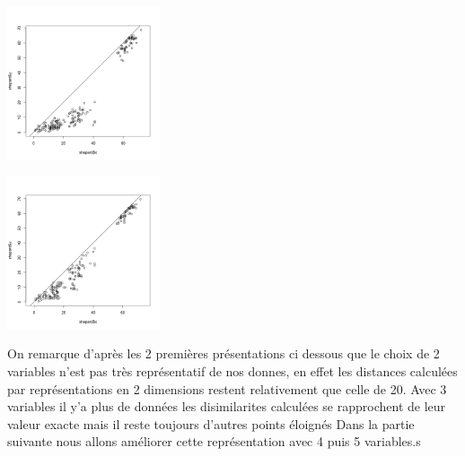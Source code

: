 \documentclass[10pt]{article}
\begin{document}
			\begin{minipage}{.5\textwidth}
		\includegraphics[width=45mm]{Figures/Mutations2_1/shepard2.png}
		\label{fig:shepard2}
	\end{minipage}%
	\hspace{0.02\linewidth}
	\begin{minipage}{.5\textwidth}
		\includegraphics[width=45mm]{Figures/Mutations2_1/shepard3.png}
		\label{fig:shepard3}
	\end{minipage}
	\vspace{0.2mm}
	
	On remarque d'après les 2 premières présentations ci dessous que le choix de 2 variables n'est pas très représentatif de nos donnes, en effet les distances calculées par représentations en 2 dimensions restent relativement que celle de 20. Avec 3 variables il y'a plus de données les disimilarites calculées se rapprochent de leur valeur exacte mais il reste toujours d'autres points éloignés Dans la partie suivante nous allons améliorer cette représentation avec 4 puis 5 variables.s
	
\end{document}
